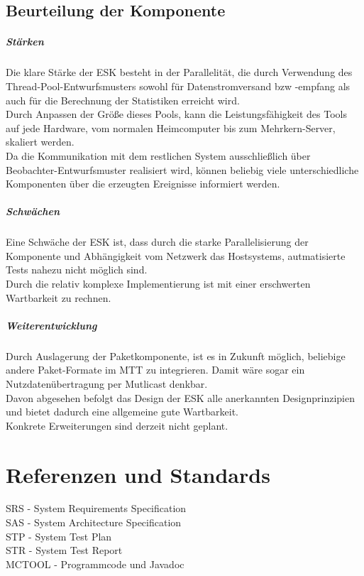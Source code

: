 \section{Beurteilung der Komponente}
\paragraph{Stärken}
Die klare Stärke der ESK besteht in der Parallelität, die durch Verwendung des
Thread-Pool-Entwurfsmusters sowohl für Datenstromversand bzw -empfang als auch
für die Berechnung der Statistiken erreicht wird.\\
Durch Anpassen der Größe dieses Pools, kann die Leistungsfähigkeit des Tools
auf jede Hardware, vom normalen Heimcomputer bis zum Mehrkern-Server, skaliert
werden.\\
Da die Kommunikation mit dem restlichen System ausschließlich über
Beobachter-Entwurfsmuster realisiert wird, können beliebig viele
unterschiedliche Komponenten über die erzeugten Ereignisse informiert werden.

\paragraph{Schwächen}
Eine Schwäche der ESK ist, dass durch die starke Parallelisierung der Komponente
und Abhängigkeit vom Netzwerk das Hostsystems, autmatisierte Tests nahezu nicht
möglich sind.\\
Durch die relativ komplexe Implementierung ist mit einer erschwerten Wartbarkeit
zu rechnen.

\paragraph{Weiterentwicklung}
Durch Auslagerung der Paketkomponente, ist es in Zukunft möglich, beliebige
andere Paket-Formate im MTT zu integrieren. Damit wäre sogar ein
Nutzdatenübertragung per Mutlicast denkbar.\\
Davon abgesehen befolgt das Design der ESK alle anerkannten Designprinzipien und
bietet dadurch eine allgemeine gute Wartbarkeit.\\
Konkrete Erweiterungen sind derzeit nicht geplant.


\chapter{Referenzen und Standards}
SRS - System Requirements Specification\\
SAS - System Architecture Specification\\
STP - System Test Plan\\
STR - System Test Report\\
MCTOOL - Programmcode und Javadoc\\